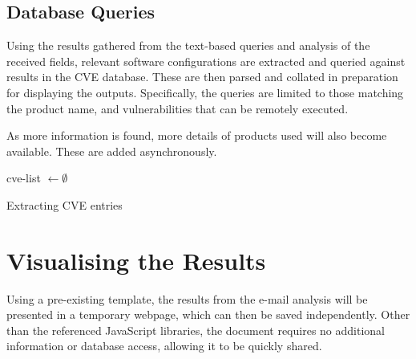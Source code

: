 \subsection{Database Queries}

Using the results gathered from the text-based queries and analysis of the
received fields, relevant software configurations are extracted and queried
against results in the CVE database.  These are then parsed and collated in
preparation for displaying the outputs. Specifically, the queries are limited
to those matching the product name, and vulnerabilities that can be remotely
executed. 

As more information is found, more details of products used will also become
available.  These are added asynchronously.

\begin{algorithm}
	cve-list $\gets\emptyset$\;
	\;
	\caption{Extracting CVE entries}
\end{algorithm}

\section{Visualising the Results}

Using a pre-existing template, the results from the e-mail analysis will be
presented in a temporary webpage, which can then be saved independently.  Other
than the referenced JavaScript libraries, the document requires no additional
information or database access, allowing it to be quickly shared.
